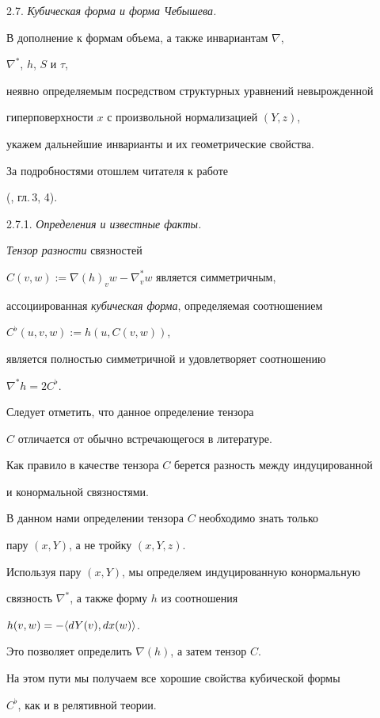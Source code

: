 2.7. {\it Кубическая форма и форма Чебышева.}


В дополнение к формам объема, а также инвариантам $\nabla$,


$\nabla^*$, $h$, $S$ и $\tau$,


неявно определяемым посредством структурных уравнений невырожденной


гиперповерхности $x$ с произвольной нормализацией $(Y,z)$,


укажем дальнейшие инварианты и их геометрические свойства.


За подробностями отошлем читателя к работе


(\cite{SIM-S-V}, гл.\,3, 4).


\smallskip





2.7.1. {\it Определения и известные факты.}


{\it Тензор разности} связностей


$C(v,w):= \nabla (h)_v w - \nabla^*_v w$ является симметричным,


ассоциированная {\it кубическая форма}, определяемая соотношением


$C^{\flat}(u,v,w):= h(u,C(v,w))$,


является полностью симметричной и удовлетворяет соотношению


$\nabla^* h = 2 C^{\flat}$.


Следует отметить, что данное определение тензора


$C$ отличается от обычно встречающегося в литературе.


Как правило в качестве тензора $C$ берется разность между индуцированной


и конормальной связностями.


В данном нами определении тензора $C$ необходимо знать только


пару $(x,Y)$, а не тройку $(x,Y,z)$.


Используя пару $(x,Y)$, мы определяем индуцированную конормальную


связность $\nabla^*$, а также форму $h$ из соотношения


$h(v,w)= - \langle dY(v), dx(w)\rangle$.


Это позволяет определить $\nabla(h)$, а затем тензор $C$.


На этом пути мы получаем все хорошие свойства кубической формы


$C^{\flat}$, как и в релятивной теории.





